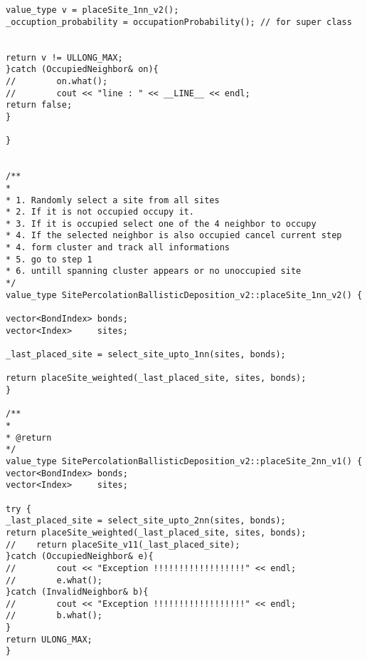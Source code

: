 \begin{lstlisting}[style=CStyle]
value_type v = placeSite_1nn_v2();
_occuption_probability = occupationProbability(); // for super class


return v != ULLONG_MAX;
}catch (OccupiedNeighbor& on){
//        on.what();
//        cout << "line : " << __LINE__ << endl;
return false;
}

}


/**
*
* 1. Randomly select a site from all sites
* 2. If it is not occupied occupy it.
* 3. If it is occupied select one of the 4 neighbor to occupy
* 4. If the selected neighbor is also occupied cancel current step
* 4. form cluster and track all informations
* 5. go to step 1
* 6. untill spanning cluster appears or no unoccupied site
*/
value_type SitePercolationBallisticDeposition_v2::placeSite_1nn_v2() {

vector<BondIndex> bonds;
vector<Index>     sites;

_last_placed_site = select_site_upto_1nn(sites, bonds);

return placeSite_weighted(_last_placed_site, sites, bonds);
}

/**
*
* @return
*/
value_type SitePercolationBallisticDeposition_v2::placeSite_2nn_v1() {
vector<BondIndex> bonds;
vector<Index>     sites;

try {
_last_placed_site = select_site_upto_2nn(sites, bonds);
return placeSite_weighted(_last_placed_site, sites, bonds);
//    return placeSite_v11(_last_placed_site);
}catch (OccupiedNeighbor& e){
//        cout << "Exception !!!!!!!!!!!!!!!!!!" << endl;
//        e.what();
}catch (InvalidNeighbor& b){
//        cout << "Exception !!!!!!!!!!!!!!!!!!" << endl;
//        b.what();
}
return ULONG_MAX;
}
\end{lstlisting}